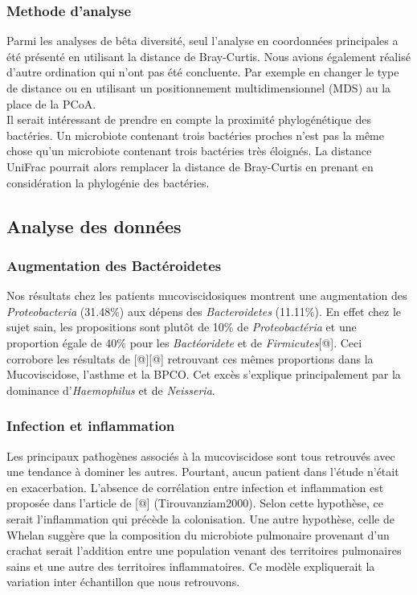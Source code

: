 \documentclass[12pt,a4paper]{article}
\begin{document}
\subsubsection{Methode d'analyse}
Parmi les analyses de bêta diversité, seul l'analyse en coordonnées principales a été présenté en utilisant la distance de Bray-Curtis.
Nous avions également réalisé d'autre ordination qui n'ont pas été concluente. Par exemple en changer le type de distance ou en utilisant un positionnement multidimensionnel (MDS) au la place de la PCoA. \\
Il serait intéressant de prendre en compte la proximité phylogénétique des bactéries. Un microbiote contenant trois bactéries proches n'est pas la même chose qu'un microbiote contenant trois bactéries très éloignés.
La distance UniFrac\cite{Lozupone2005} pourrait alors remplacer la distance de Bray-Curtis en prenant en considération la phylogénie des bactéries.



\subsection{Analyse des données}
\subsubsection{Augmentation des Bactéroidetes}
Nos résultats chez les patients mucoviscidosiques montrent une augmentation des \textit{Proteobacteria} (31.48\%) aux dépens des \textit{Bacteroidetes} (11.11\%). En effet chez le sujet sain, les propositions sont plutôt de 10\% de \textit{Proteobactéria} et une proportion égale de 40\% pour les \textit{Bactéoridete} et de \textit{Firmicutes}[@].
Ceci corrobore les résultats de [@][@] retrouvant ces mêmes proportions dans la Mucoviscidose, l’asthme et la BPCO. Cet excès s’explique principalement par la dominance d’\textit{Haemophilus} et de \textit{Neisseria}.
\subsubsection{Infection et inflammation}
Les principaux pathogènes associés à la mucoviscidose sont tous retrouvés avec une tendance à dominer les autres. Pourtant, aucun patient dans l'étude n'était en exacerbation. L'absence de corrélation entre infection et inflammation est proposée dans l'article de [@] (Tirouvanziam2000). Selon cette hypothèse, ce serait l'inflammation qui précède la colonisation.
Une autre hypothèse, celle de Whelan \cite{Whelan2015} suggère que la composition du microbiote pulmonaire provenant d'un crachat serait l'addition entre une population venant des territoires pulmonaires sains et une autre des territoires inflammatoires. Ce modèle expliquerait la variation inter échantillon que nous retrouvons.
\end{document}
